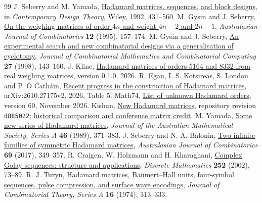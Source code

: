 \documentclass[10pt]{article}
\begin{document}
\begin{thebibliography}{99}
\setlength{\itemsep}{0pt}
 J. Seberry and M. Yamada, \href{https://documents.uow.edu.au/~jennie/WEBPDF/175_1992.pdf}{Hadamard matrices, sequences, and block designs}, in \emph{Contemporary Design Theory}, Wiley, 1992, 431--560.
 M. Gysin and J. Seberry, \href{https://ajc.maths.uq.edu.au/pdf/12/ocr-ajc-v12-p157.pdf}{On the weighing matrices of order $4n$ and weight $4n-2$ and $2n-1$}, \emph{Australasian Journal of Combinatorics} \textbf{12} (1995), 157--174.
 M. Gysin and J. Seberry, \href{https://combinatorialpress.com/article/jcmcc/Volume\%20027/vol-27-paper\%2012.pdf}{An experimental search and new combinatorial designs via a generalisation of cyclotomy}, \emph{Journal of Combinatorial Mathematics and Combinatorial Computing} \textbf{27} (1998), 143--160.
 J. Kline, \href{https://doi.org/10.5281/zenodo.24519197}{Hadamard matrices of orders 5164 and 8332 from real weighing matrices}, version 0.1.0, 2026.
 R. Egan, I. S. Kotsireas, S. London and P. \'O Cath\'ain, \href{https://arxiv.org/html/2610.27175v2#S4.T5}{Recent progress in the construction of Hadamard matrices}, arXiv:2610.27175v2, 2026, Table 5.
 Math74, \href{https://www.math74.com/Hadamard/unknown.html}{List of unknown Hadamard orders}, version 60, November 2026.
 Kishan, \href{https://github.com/vatskishan03/Hadamard/blob/d885022144ba6bf4efa8315e14871a3736947527/FRONTIER.md}{New Hadamard matrices}, repository revision \texttt{d885022}; \href{https://generalised.si/research/skew-symmetric-hadamard}{historical comparison and conference matrix credit}.
 M. Yamada, \href{https://doi.org/10.1017/S144678870003086X}{Some new series of Hadamard matrices}, \emph{Journal of the Australian Mathematical Society, Series A} \textbf{46} (1989), 371--383.
 J. Seberry and N. A. Balonin, \href{https://ajc.maths.uq.edu.au/pdf/69/ajc_v69_p349.pdf}{Two infinite families of symmetric Hadamard matrices}, \emph{Australasian Journal of Combinatorics} \textbf{69} (2017), 349--357.
 R. Craigen, W. Holzmann and H. Kharaghani, \href{https://doi.org/10.1016/S0012-365X(01)00162-5}{Complex Golay sequences: structure and applications}, \emph{Discrete Mathematics} \textbf{252} (2002), 73--89.
 R. J. Turyn, \href{https://doi.org/10.1016/0097-3165(74)90056-9}{Hadamard matrices, Baumert--Hall units, four-symbol sequences, pulse compression, and surface wave encodings}, \emph{Journal of Combinatorial Theory, Series A} \textbf{16} (1974), 313--333.

\end{thebibliography}
\end{document}
